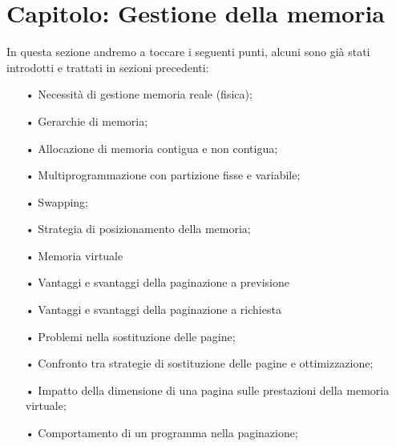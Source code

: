 \documentclass{article}
\begin{document}
\section{Capitolo: Gestione della memoria}
In questa sezione andremo a toccare i seguenti punti, alcuni sono già stati introdotti e trattati in sezioni precedenti:
\begin{enumerate}
   \item[•] Necessità di gestione memoria reale (fisica);
   \item[•] Gerarchie di memoria;
   \item[•] Allocazione di memoria contigua e non contigua;
   \item[•] Multiprogrammazione con partizione fisse e variabile;
   \item[•] Swapping;
   \item[•] Strategia di posizionamento della memoria;
   \item[•] Memoria virtuale
   \item[•] Vantaggi e svantaggi della paginazione a previsione
   \item[•] Vantaggi e svantaggi della paginazione a richiesta
   \item[•] Problemi nella sostituzione delle pagine;
   \item[•] Confronto tra strategie di sostituzione delle pagine e ottimizzazione;
   \item[•] Impatto della dimensione di una pagina sulle prestazioni della memoria
            virtuale;
   \item[•] Comportamento di un programma nella paginazione;
\end{enumerate}
\end{document}
